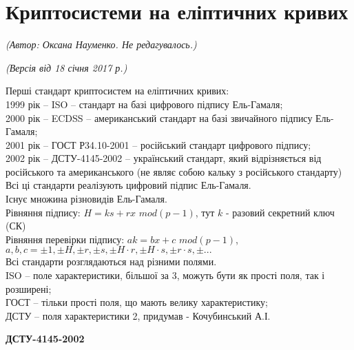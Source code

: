 \section{Криптосистеми на еліптичних кривих}
\begin{flushright}
\emph{(Автор: Оксана Науменко. Не редагувалось.)}
\par \emph{(Версія від 18 січня 2017 р.)}
\end{flushright}

Перші стандарт криптосистем на еліптичних кривих:\\
1999 рік -- ISO -- стандарт на базі цифрового підпису Ель-Гамаля;\\
2000 рік -- ECDSS -- американський стандарт на базі звичайного підпису Ель-Гамаля;\\
2001 рік -- ГОСТ Р34.10-2001 -- російський стандарт цифрового підпису;\\
2002 рік -- ДСТУ-4145-2002 -- український стандарт, який відрізняється від російського та американського (не являє собою кальку з російського стандарту)\\
Всі ці стандарти реалізують цифровий підпис Ель-Гамаля.\\
Існує множина різновидів Ель-Гамаля.\\
Рівняння підпису: $H=ks+rx$   $mod(p-1)$, тут $k$ - разовий секретний ключ (СК)\\
Рівняння перевірки підпису: $ak=bx+c$ $mod(p-1)$, $a, b, c = \pm 1, \pm H, \pm r, \pm s, \pm H\cdot r, \pm H\cdot s,\pm r \cdot s, \pm ...$\\
Всі стандарти розглядаються над різними полями.\\
ISO -- поле характеристики, більшої за 3, можуть бути як прості поля, так і розширені;\\
ГОСТ -- тільки прості поля, що мають велику характеристику;\\
ДСТУ -- поля характеристики 2, придумав - Кочубинський А.І.\\
\begin{center}
\textbf{ДСТУ-4145-2002\\}
\end{center}
